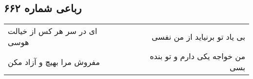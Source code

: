 \begin{center}
\section*{رباعی شماره ۶۶۲}
\label{sec:sh662}
\begin{longtable}{l p{0.5cm} r}
ای در سر هر کس از خیالت هوسی
&&
بی یاد تو برنیاید از من نفسی
\\
مفروش مرا بهیچ و آزاد مکن
&&
من خواجه یکی دارم و تو بنده بسی
\\
\end{longtable}
\end{center}
